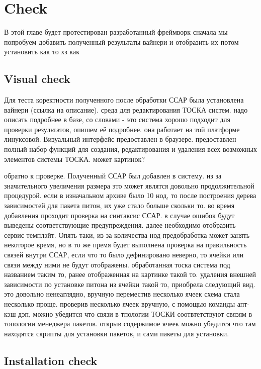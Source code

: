 
\chapter{Check}\label{chap:check}
В этой главе будет протестирован разработанный фреймворк
сначала мы попробуем добавить полученный результаты вайнери и отобразить их
потом установить как то хз как
\fi
\section{Visual check}
Для теста коректности полученного после обработки ССАР была установлена вайнери (ссылка на описание). среда для редактирования ТОСКА систем.
надо описать подробнее в базе, со словами - это система хорошо подходит для проверки результатов, опишем её подробнее.
она работает на той платформе линуксовой. Визуальный интерфейс предоставлен в браузере. предоставлен полный набор функций для создания, редактирования и удаления всех возможных элементов системы ТОСКА. может картинок?

обратно к проверке.
Полученный ССАР был добавлен в систему. из за значительного увеличения размера это может являтся довольно продолжительной процедурой. если в изначальном архиве было 10 нод, то после построения дерева зависимостей для пакета питон, их уже стало больше скольки то.
во время добавления проходит проверка на синтаксис ССАР. в случае ошибок будут выведены соответствующие предупреждения.
далее необходимо отобразить сервис темплэйт. Опять таки, из за количества нод предобработка может занять некоторое время, но в то же премя будет выполнена проверка на правильность связей внутри ССАР, если что то было дефинировано неверно, то ячейки или связи между ними не будут отображены.
обработанная тоска система под названием таким то, ранее отображенная на картинке такой то. удаления внешней зависимости по установке питона из ячейки такой то, приобрела следующий вид.
это довольно ненеаглядно, вручную переместив несколько ячеек схема стала несколько проще. проверив несколько ячеек вручную, с помощью команды апт-кэш дэп, можно убедится что связи в тпологии ТОСКИ соотвтетствуют связям в топологии менеджера пакетов.
открыв содержимое ячеек можно убедится что там находятся скрипты для установки пакетов, и сами пакеты для установки.
 
\fi
\section{Installation check}
\fi